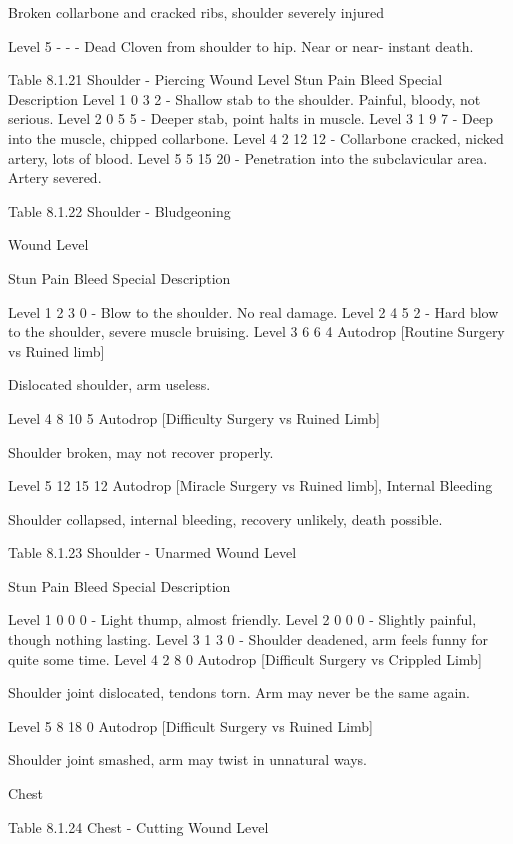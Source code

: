 \documentclass[oneside,11pt,english]{book}
\begin{document}
Broken collarbone and cracked ribs, shoulder 
severely injured 

Level 5 - - - Dead Cloven from shoulder to hip. Near or near-
instant death. 

 
Table 8.1.21 Shoulder - Piercing 
Wound Level Stun Pain Bleed Special Description 
Level 1 0 3 2 - Shallow stab to the shoulder. Painful, bloody, not serious. 
Level 2 0 5 5 - Deeper stab, point halts in muscle. 
Level 3 1 9 7 - Deep into the muscle, chipped collarbone. 
Level 4 2 12 12 - Collarbone cracked, nicked artery, lots of blood. 
Level 5 5 15 20 - Penetration into the subclavicular area. Artery severed. 

 
Table 8.1.22 Shoulder - Bludgeoning 


Wound 
Level 

Stun Pain Bleed Special Description 

Level 1 2 3 0 - Blow to the shoulder. No real damage. 
Level 2 4 5 2 - Hard blow to the shoulder, severe muscle 
bruising. 
Level 3 6 6 4 Autodrop 
[Routine Surgery vs Ruined 
limb] 

Dislocated shoulder, arm useless. 

Level 4 8 10 5 Autodrop 
[Difficulty Surgery vs Ruined 
Limb] 

Shoulder broken, may not recover properly. 

Level 5 12 15 12 Autodrop 
[Miracle Surgery vs Ruined 
limb], Internal Bleeding 

Shoulder collapsed, internal bleeding, 
recovery unlikely, death possible. 

 
Table 8.1.23 Shoulder - Unarmed 
Wound 
Level 

Stun Pain Bleed Special Description 

Level 1 0 0 0 - Light thump, almost friendly. 
Level 2 0 0 0 - Slightly painful, though nothing lasting. 
Level 3 1 3 0 - Shoulder deadened, arm feels funny for quite 
some time. 
Level 4 2 8 0 Autodrop 
[Difficult Surgery vs 
Crippled Limb] 

Shoulder joint dislocated, tendons torn. Arm may 
never be the same again. 

Level 5 8 18 0 Autodrop 
[Difficult Surgery vs 
Ruined Limb] 

Shoulder joint smashed, arm may twist in 
unnatural ways. 

 

 

Chest 

 
Table 8.1.24 Chest - Cutting 
Wound 
Level 
\end{document}
